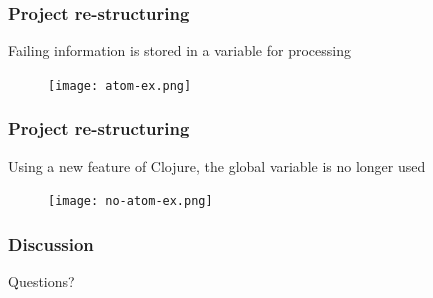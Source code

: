\documentclass{beamer}
\begin{document}
\begin{frame}
  \frametitle{Project re-structuring}
Failing information is stored in a variable for processing
\begin{figure}
\texttt{[image: atom-ex.png]}
\end{figure}
\end{frame}

\begin{frame}
  \frametitle{Project re-structuring}
Using a new feature of Clojure, the global variable is no longer used
\begin{figure}
\texttt{[image: no-atom-ex.png]}
\end{figure}
\end{frame}

\begin{frame}
  \frametitle{Discussion}
Questions?
\end{frame}
\end{document}
